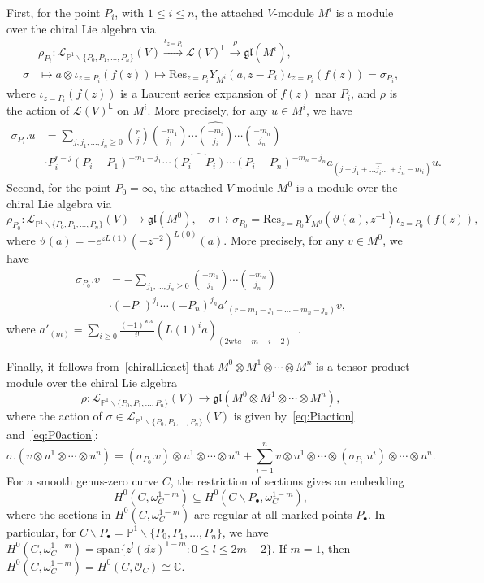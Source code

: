\documentclass[12pt,a4paper,reqno]{amsart}
\numberwithin{equation}{section}
\theoremstyle{definition}
\newcommand{\C}{\mathbb{C}}
\renewcommand{\P}{\mathbb{P}}
\newcommand{\gl}{\mathfrak{gl}}
\def\O{\mathcal{O}}
\def\L{\mathsf{L}}
\def\spn{\mathrm{span}}
\def\bs{\backslash}
\def\om{\omega}
\def\o{\otimes}
\def\wt{\mathrm{wt}}
\def\ra{\rightarrow}
\def\ssq{\subseteq}
\def\ds{\dots}
\def\Res{\mathrm{Res}}
\def\si{\sigma}
\begin{document}
First, for the point $P_i$, with $1\leq i\leq n$, the attached $V$-module $M^i$ is a module over the chiral Lie algebra via
\[
\begin{split}
   & \rho_{P_i}: \mathcal{L}_{\P^1\bs \{P_0,P_1,\ds ,P_n\}}(V)\xrightarrow{\iota_{z=P_i}} \mathcal{L}(V)^\L \stackrel{\rho}{\longrightarrow} \gl(M^i),\\
 \si &\mapsto a\o \iota_{z=P_i}(f(z))\mapsto \Res_{z=P_i}Y_{M^i}(a,z-P_i)\iota_{z=P_i}(f(z))=\si_{P_i},
\end{split}
\]
where $\iota_{z=P_i}(f(z))$ is a Laurent series expansion of $f(z)$ near $P_i$, and $\rho$ is the action of $\mathcal{L}(V)^\L$ on $M^i$.
More precisely, for any $u\in M^i$, we have
\begin{equation}\label{eq:Piaction}
    \begin{aligned}
\si_{P_i}.u&=  \sum_{j,j_1,\ds ,j_n\geq 0} \binom{r}{j}\binom{-m_1}{j_1}\cdots \widehat{\binom{-m_i}{j_i}}\cdots \binom{-m_n}{j_n} \\
 &\cdot P_i^{r-j} (P_i-P_1)^{-m_1-j_1}\cdots \widehat{(P_i-P_{i})}\cdots(P_i-P_n)^{-m_n-j_n} a_{(j+j_1+\ds\hat{j_i}\ds +j_n-m_i)}u.
    \end{aligned}
\end{equation}
Second, for the point $P_0=\infty$, the attached $V$-module $M^0$ is a module over the chiral Lie algebra via
\[
\rho_{P_0}: \mathcal{L}_{\P^1\bs \{P_0,P_1,\ds ,P_n\}}(V)\ra \gl(M^0),\quad \si\mapsto \si_{P_0}=\Res_{z=P_0}Y_{M^0}(\vartheta(a),z^{-1})\iota_{z=P_0}(f(z)),
\]
where $\vartheta(a)=-e^{zL(1)}(-z^{-2})^{L(0)}(a)$.
More precisely, for any $v\in M^0$, we have
\begin{equation}\label{eq:P0action}
    \begin{aligned}
\si_{P_0}.v&=  -\sum_{j_1,\ds ,j_n\geq 0}\binom{-m_1}{j_1}\cdots \binom{-m_n}{j_n} \\
 &\cdot  (-P_1)^{j_1}\cdots (-P_n)^{j_n} a'_{(r-m_1-j_1-\ds -m_n-j_n)}v,
    \end{aligned}
\end{equation}
where  $a'_{(m)}=\sum_{i\geq 0} \frac{(-1)^{\wt a}}{i!} (L(1)^ia)_{(2\wt a-m-i-2)}$~\cite[Section 5.2]{FHL93}.

Finally, it follows from~\eqref{chiralLieact} that $M^0\o M^1\o\cdots\o M^n$ is a tensor product module over the chiral Lie algebra
\[
\rho: \mathcal{L}_{\P^1\bs \{P_0,P_1,\ds ,P_n\}}(V)\ra \gl(M^0\o M^1\o\cdots\o M^n),
\]
where the action of $\si\in \mathcal{L}_{\P^1\bs \{P_0,P_1,\ds ,P_n\}}(V)$ is given by~\eqref{eq:Piaction} and~\eqref{eq:P0action}:
\[
\si.(v\o u^1\o\cdots\o u^n)=(\si_{P_0}.v)\o u^1\o\cdots\o u^n+\sum_{i=1}^n v\o u^1\o\cdots\o (\si_{P_i}.u^i)\o\cdots\o u^n.
\]
For a smooth genus-zero curve $C$, the restriction of sections gives an embedding
\[H^0(C,\om_C^{1-m})\ssq H^0(C\bs P_\bullet,\om_C^{1-m}),\]
where the sections in $H^0(C,\om_C^{1-m})$ are regular at all marked points $P_\bullet$.
In particular, for $C\bs P_\bullet=\P^1\bs\{P_0,P_1,\ds ,P_n\}$, we have $H^0(C,\om_C^{1-m})=\spn\{ z^l (dz)^{1-m}: 0\leq l\leq 2m-2\}$. If $m=1$, then $H^0(C,\om_C^{1-m})=H^0(C,\O_C)\cong \C$.
\end{document}
